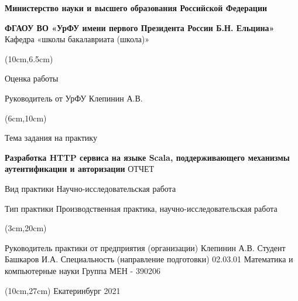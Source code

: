 \documentclass[14pt]{extarticle}
\begin{document}
    \thispagestyle{empty}
    \begin{center}
        \textbf{Министерство науки и высшего образования Российской Федерации}

        \textbf{ФГАОУ ВО «УрФУ имени первого Президента России Б.Н. Ельцина»}
        Кафедра «школы бакалавриата (школа)»
    \end{center}
    \begin{textblock*}{10cm}(10cm,6.5cm)
        \begin{center}
            Оценка работы \underline{\hspace{1cm}}

            Руководитель от УрФУ Клепинин А.В.
        \end{center}
    \end{textblock*}
    \begin{textblock*}{10cm}(6cm,10cm)

        \begin{center}
            Тема задания на практику
            \linebreak

            \textbf{Разработка HTTP сервиса на языке Scala, поддерживающего механизмы аутентификации и авторизации}
            \linebreak
            \linebreak
            ОТЧЕТ

            Вид практики Научно-исследовательская работа

            Тип практики Производственная практика, научно-исследовательская работа

        \end{center}
    \end{textblock*}
    \begin{textblock*}{16cm}(3cm,20cm)

        \begin{flushleft}
            Руководитель практики от предприятия (организации) Клепинин А.В.
            \linebreak\linebreak
            Студент Башкаров И.А.
            \linebreak\linebreak
            Специальность (направление подготовки) 02.03.01 Математика и компьютерные
            науки
            \linebreak\linebreak
            Группа МЕН - 390206
        \end {flushleft}
    \end{textblock*}
    \begin{textblock*}{16cm}(10cm,27cm)
        Екатеринбург 2021
    \end{textblock*}
    \pagebreak
\end{document}
